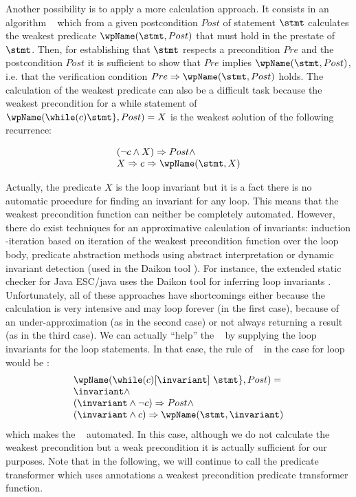 Another possibility is to apply a  more calculation approach. It consists in an algorithm \wpName~ which 
from a given postcondition $Post$   of statement $\stmt$ calculates the weakest predicate $\wpName(\stmt, Post)$ 
that must hold in the  prestate of $\stmt$. Then, for establishing that
  $\stmt$ respects a precondition  $Pre$ and the postcondition   $Post$ it is sufficient to show that $Pre$ implies $\wpName(\stmt, Post) $, i.e. that 
the verification condition $Pre \Rightarrow \wpName(\stmt, Post)$ holds. 
The calculation of the weakest predicate can also be a difficult task because  the weakest precondition for a while statement of
$\wpName( \while ( c ) \do \{ \stmt \} ,Post) = X$ is the weakest solution of the following recurrence:

$$\begin{array}{l}
(\neg c \wedge X) \Rightarrow  Post \wedge \\
X \Rightarrow c \Rightarrow \wpName (\stmt, X) 
\end{array}$$
 
 Actually, the predicate $X$ is the loop invariant but it is a fact there is no automatic procedure for finding an invariant for any loop.
 This means that the weakest precondition function can neither be completely automated. However, there do exist techniques for an approximative calculation of invariants: 
induction -iteration  \cite{SI77IABC} based on iteration of the weakest precondition function over the loop body,
predicate abstraction methods \cite{FQ03PAQ} using abstract interpretation or dynamic invariant detection (used in the Daikon tool \cite{ernst99dynamically}).
For instance, the extended static checker for Java ESC/java uses the Daikon tool  for inferring loop invariants \cite{NimmerE01:RV}.  
Unfortunately, all of these approaches have shortcomings either because the calculation is very intensive and may loop forever (in the first case),
 because  of an under-approximation (as in the second case) or not always returning 
a result (as in the third case). We can actually ``help'' the \wpName~ by supplying the loop invariants for the loop statements.
 In that case, the rule of \wpName~ in the case for loop would be :
$$ \begin{array}{l} 
    \wpName ( \while  ( c ) \lbrack \invariant \rbrack \  \do \{ \stmt \} ,Post) = \\
   \invariant \wedge \\
   (\invariant \wedge \neg c) \Rightarrow Post  \wedge \\
    (\invariant \wedge  c) \Rightarrow \wpName(\stmt, \invariant)
   \end{array} $$
which makes the \wpName~ automated.  In this case, although we do not calculate the weakest precondition but a weak precondition it is actually 
sufficient for our purposes. Note that in the following, we will continue to call  the predicate transformer which uses annotations a
 weakest precondition predicate transformer function. 

